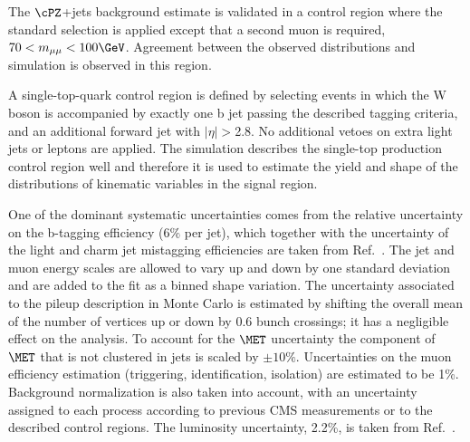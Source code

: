 The $\cPZ$+jets background estimate is validated in a control region where the standard selection 
is applied except that a second muon is required,  $ 70 < m_{\mu\mu} < 100\GeV$. Agreement
between the observed distributions and simulation is observed in this region.

A single-top-quark control region is defined by selecting events in which the
W boson is accompanied by exactly one b jet
passing the described tagging criteria, and an additional forward jet with $|\eta|>$2.8.
No additional vetoes on extra light jets or leptons are applied.
The simulation describes the single-top production control region
well and therefore
it is used to estimate the yield and shape of the distributions of kinematic variables in the signal region.

One of the dominant systematic uncertainties comes from the 
relative uncertainty on the b-tagging efficiency ($6\%$ per jet), which together with the uncertainty of the light and charm 
jet mistagging efficiencies are taken from Ref.~\cite{BTAGNOTE}.
The jet and muon energy scales are allowed to vary up and down by one standard deviation and
are added to the fit as a binned shape variation.
The uncertainty associated to the pileup description in Monte Carlo is estimated by shifting the overall mean of 
the number of vertices up or down by 0.6 bunch crossings; it has a negligible effect on the analysis.
To account for the $\MET$ uncertainty the component of $\MET$ that is not clustered in jets is scaled by $\pm10\%$.
Uncertainties on the muon efficiency estimation (triggering, identification, isolation) are estimated to be 1\%.
Background normalization is also taken into account, with an uncertainty assigned to each process
according to previous CMS measurements or to the described control regions. 
The luminosity uncertainty, 2.2\%, 
is taken from Ref.~\cite{CMS-PAS-SMP-12-008}.

